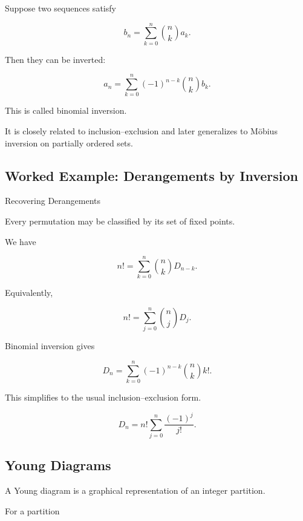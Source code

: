 Suppose two sequences satisfy

\[
b_n
=
\sum_{k=0}^{n}
\binom{n}{k}a_k.
\]

Then they can be inverted:

\[
\boxed{
a_n
=
\sum_{k=0}^{n}
(-1)^{n-k}
\binom{n}{k}
b_k.
}
\]

This is called binomial inversion.

It is closely related to inclusion--exclusion and later generalizes to
Möbius inversion on partially ordered sets.

\subsection{Worked Example: Derangements by Inversion}
\label{subsec:worked-derangement-inversion}

\begin{workedexamplebox}{Recovering Derangements}

Every permutation may be classified by its set of fixed points.

We have

\[
n!
=
\sum_{k=0}^{n}
\binom{n}{k}D_{n-k}.
\]

Equivalently,

\[
n!
=
\sum_{j=0}^{n}
\binom{n}{j}D_j.
\]

Binomial inversion gives

\[
D_n
=
\sum_{k=0}^{n}
(-1)^{n-k}
\binom{n}{k}k!.
\]

This simplifies to the usual inclusion--exclusion form.

\begin{answerbox}
\[
\boxed{
D_n
=
n!
\sum_{j=0}^{n}
\frac{(-1)^j}{j!}.
}
\]
\end{answerbox}

\end{workedexamplebox}

\subsection{Young Diagrams}
\label{subsec:young-diagrams}

A Young diagram is a graphical representation of an integer partition.

For a partition

